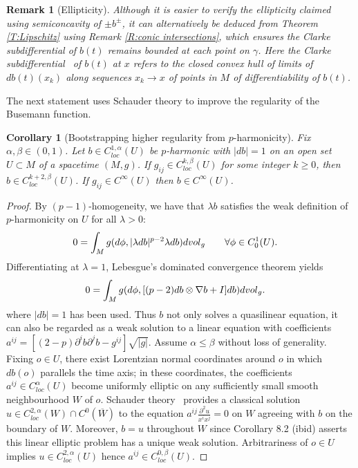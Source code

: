 \documentclass[12pt]{amsart}
\newcommand{\p}{{\partial}}
\newcommand{\vol}{{\rm vol}}
\newcommand{\vg}{\vol_g}
\newtheorem{corollary}[theorem]{Corollary}
\newtheorem{remark}[theorem]{Remark}
\begin{document}
\begin{remark}[Ellipticity]
Although it is easier to verify the ellipticity claimed using semiconcavity of $\pm b^\pm$,  it can alternatively be deduced from Theorem \ref{T:Lipschitz} using Remark \ref{R:conic intersections}, which ensures the Clarke subdifferential of $b(t)$ remains bounded at each point on $\gamma$.   Here the Clarke subdifferential~\cite{Clarke83} of $b(t)$ at $x$ refers to the closed convex hull of limits of $db(t)(x_k)$ along sequences $x_k \to x$ of points in $M$ of differentiability of $b(t)$.
\end{remark}


\iffalse
{The next statement uses Schauder theory to improve the regularity of the Busemann function.

\begin{corollary}[Bootstrapping higher regularity from $p$-harmonicity]\label{C:smoothness}
Fix $\alpha,\beta\in(0,1)$.
Let $b \in C^{1,\alpha}_{loc}(U)$ be $p$-harmonic with $|db|=1$ on an open set $U \subset M$ of a spacetime $(M,g)$.
If $g_{ij} \in C^{k,\beta}_{loc}(U)$ for some %
integer $k \ge 0$, then $b \in C^{k+2,\beta}_{loc}(U)$.
If $g_{ij} \in C^{\infty}(U)$ then $b \in C^{\infty}(U)$.
\end{corollary}

\begin{proof}
By $(p-1)$-homogeneity, we have that $\lambda b$ satisfies the weak definition of $p$-harmonicity on $U$ for all $\lambda>0$:
\begin{align*}
0 & = \int_M  g(d\phi, |\lambda db|^{p-2} \lambda db) d\vg \qquad \forall \phi \in C^1_0(U).
\end{align*}
Differentiating %
at $\lambda=1$, Lebesgue's dominated convergence theorem yields
\begin{align*}%
0 &= \int_M    %
g(d\phi, [(p-2) db \otimes \nabla b
+I] d b)d\vg .
\end{align*}
where $|db|=1$ has been used.
Thus $b$ not only solves a quasilinear equation,
it can also be regarded as a weak solution to a 
linear equation with coefficients 
$a^{ij}
=%
[(2-p)%
\p^i b \p^j b- g^{ij}]\sqrt{|g|}$.
Assume $\alpha \le \beta$ without loss of generality.
Fixing $o \in U$,
there exist Lorentzian normal coordinates around $o$ in which $db(o)$ parallels the time axis;  in these coordinates,  the coefficients $a^{ij} \in C^{\alpha}_{loc}(U)$ become uniformly elliptic on any sufficiently small smooth neighbourhood $W$ of $o$.  Schauder theory~\cite[Theorem 6.13]{GilbargTrudinger98} provides a classical
solution $u \in C^{2,\alpha}_{loc}(W) \cap C^0\left(\overline W\right)$ 
to the equation $a^{ij} \frac{\p^2 u}{x^i x^j} =0$ on $W$
agreeing with $b$ on the boundary of $W$.
Moreover, $b=u$ throughout $W$ since Corollary 8.2 (ibid) asserts this linear elliptic problem has a unique weak solution.  Arbitrariness of $o \in U$ implies $u \in C^{2,\alpha}_{loc}(U)$ hence $a^{ij} \in C^{0,\beta}_{loc}(U)$.


\end{proof}}
\end{document}
